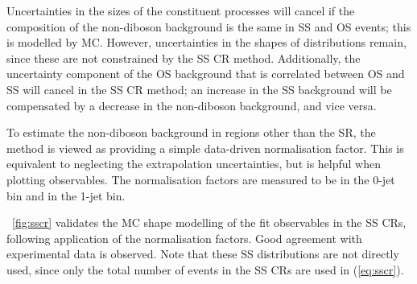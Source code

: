 Uncertainties in the sizes of the constituent processes will cancel if the composition of the 
non-\WW diboson background is the same in SS and OS events; this is modelled by MC. However, 
uncertainties in the shapes of distributions remain, since these are not constrained by the 
SS CR method. Additionally, the uncertainty component of the OS \Wjets background that is 
correlated between OS and SS will cancel in the SS CR method; an increase in the SS \Wjets 
background will be compensated by a decrease in the non-\WW diboson background, and vice 
versa.

To estimate the non-\WW diboson background in regions other than the SR, the method is viewed 
as providing a simple data-driven normalisation factor. This is equivalent to neglecting the 
extrapolation uncertainties, but is helpful when plotting observables. The normalisation 
factors are measured to be  in the 0-jet bin and  in the 
1-jet bin. 

\Figure~\ref{fig:sscr} validates the MC shape modelling of the fit observables in the SS CRs, 
following application of the normalisation factors. Good agreement with experimental data is 
observed. Note that these SS distributions are not directly used, since only the total number 
of events in the SS CRs are used in (\ref{eq:sscr}).


